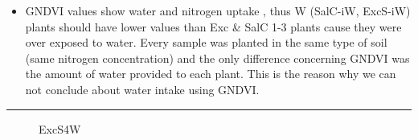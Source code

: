 \documentclass{article}
\begin{document}
{\begin{landscape}
                    \begin{itemize}
                       \item GNDVI values show water and nitrogen uptake , thus W (SalC-iW, ExcS-iW)  plants should have lower values than Exc & SalC 1-3 plants cause they were over exposed to water. Every sample was planted in the same type of soil (same nitrogen concentration) and the only difference concerning GNDVI was the amount of water provided to each plant. This is the reason why we can not conclude about water intake using GNDVI.

                    \end{itemize}
                    \newpage
                    \vspace*{-3.8\baselineskip}
                    \hrule
                    \vspace*{3\baselineskip}
                    
                    \begin{figure}[h]
                        \centering
                        \qquad
                        \caption{ExcS4W}%
                        \label{fig:example}
                    \end{figure}
                    \vspace*{2\baselineskip}
                    

\end{landscape}}
\end{document}
